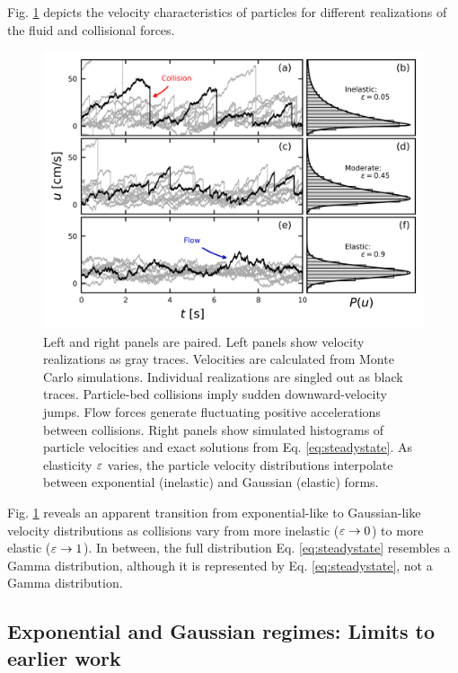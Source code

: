 Fig. \ref{fig:fig2} depicts the velocity characteristics of particles for different realizations of the fluid and collisional forces.
\begin{figure}
	\centerline{\includegraphics{./figures/ch5/Fig2pdfs.png}}
	\caption{Left and right panels are paired. Left panels show velocity realizations as gray traces. Velocities are calculated from Monte Carlo simulations. Individual realizations are singled out as black traces. Particle-bed collisions imply sudden downward-velocity jumps. Flow forces generate fluctuating positive accelerations between collisions. Right panels show simulated histograms of particle velocities and exact solutions from Eq. \ref{eq:steadystate}. As elasticity $\varepsilon$ varies, the particle velocity distributions interpolate between exponential (inelastic) and Gaussian (elastic) forms.}
	\label{fig:fig2}
\end{figure}
Fig. \ref{fig:fig2} reveals an apparent transition from exponential-like to Gaussian-like velocity distributions as collisions vary from more inelastic ($\varepsilon \rightarrow 0$) to more elastic ($\varepsilon \rightarrow 1$). In between, the full distribution Eq. \ref{eq:steadystate} resembles a Gamma distribution, although it is represented by Eq. \ref{eq:steadystate}, not a Gamma distribution.


\subsection{Exponential and Gaussian regimes: Limits to earlier work}
\label{sec:langmodelcomparison}

